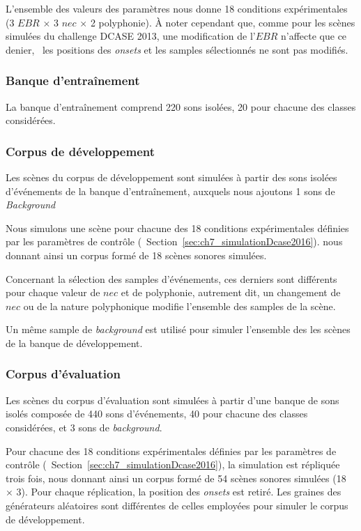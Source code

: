 L'ensemble des valeurs des paramètres nous donne 18 conditions expérimentales (3 $EBR$ $\times$ 3 $nec$ $\times$ 2 polyphonie). À noter cependant que, comme pour les scènes simulées du challenge DCASE 2013, une modification de l'$EBR$ n'affecte que ce denier, \ie~les positions des \emph{onsets} et les samples sélectionnés ne sont pas modifiés.

\subsubsection{Banque d'entraînement}

La banque d’entraînement comprend 220 sons isolées, 20 pour chacune des classes considérées.

\subsubsection{Corpus de développement}

Les scènes du corpus de développement sont simulées à partir des sons isolées d'événements de la banque d’entraînement, auxquels nous ajoutons 1 sons de \emph{Background}

Nous simulons une scène pour chacune des 18 conditions expérimentales définies par les paramètres de contrôle (\cf~Section~\ref{sec:ch7_simulationDcase2016}). nous donnant ainsi un corpus formé de 18 scènes sonores simulées.

Concernant la sélection des samples d'événements, ces derniers sont différents pour chaque valeur de $nec$ et de polyphonie, autrement dit, un changement de $nec$ ou de la nature polyphonique modifie l'ensemble des samples de la scène. 

Un même sample de \emph{background} est utilisé pour simuler l'ensemble des les scènes de la banque de développement.

\subsubsection{Corpus d'évaluation}

Les scènes du corpus d'évaluation sont simulées à partir d'une banque de sons isolés composée de 440 sons d'événements, 40 pour chacune des classes considérées, et 3 sons de \emph{background}.

Pour chacune des 18 conditions expérimentales définies par les paramètres de contrôle (\cf~Section~\ref{sec:ch7_simulationDcase2016}), la simulation est répliquée trois fois, nous donnant ainsi un corpus formé de 54 scènes sonores simulées (18 $\times$ 3). Pour chaque réplication, la position des \emph{onsets} est retiré. Les graines des générateurs aléatoires sont différentes de celles employées pour simuler le corpus de développement.

